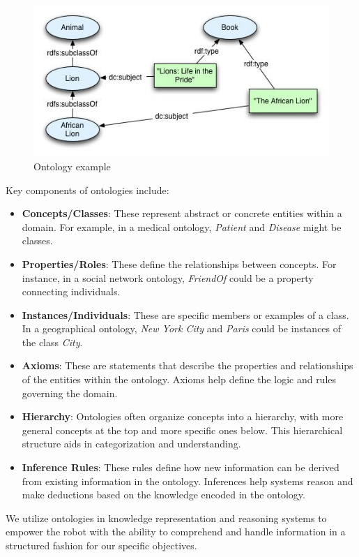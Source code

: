     \begin{figure}[H]
        \includegraphics[scale=0.8]{Graphics/ontology.jpg}
		\caption{Ontology example \cite{ontologyexample}}
    \end{figure}
	Key components of ontologies include:

	\begin{itemize}
		\item \textbf{Concepts/Classes}: These represent abstract or concrete entities within a domain. For example, in a medical ontology, \textit{Patient} and \textit{Disease} might be classes.
		\item \textbf{Properties/Roles}: These define the relationships between concepts. For instance, in a social network ontology, \textit{FriendOf} could be a property connecting individuals.
		\item \textbf{Instances/Individuals}: These are specific members or examples of a class. In a geographical ontology, \textit{New York City} and \textit{Paris} could be instances of the class \textit{City}.
		\item \textbf{Axioms}: These are statements that describe the properties and relationships of the entities within the ontology. Axioms help define the logic and rules governing the domain.
		\item \textbf{Hierarchy}: Ontologies often organize concepts into a hierarchy, with more general concepts at the top and more specific ones below. This hierarchical structure aids in categorization and understanding.
		\item \textbf{Inference Rules}: These rules define how new information can be derived from existing information in the ontology. Inferences help systems reason and make deductions based on the knowledge encoded in the ontology.
	\end{itemize}
	We utilize ontologies in knowledge representation and reasoning systems to empower the robot with the ability to comprehend and handle information in a structured fashion for our specific objectives.

